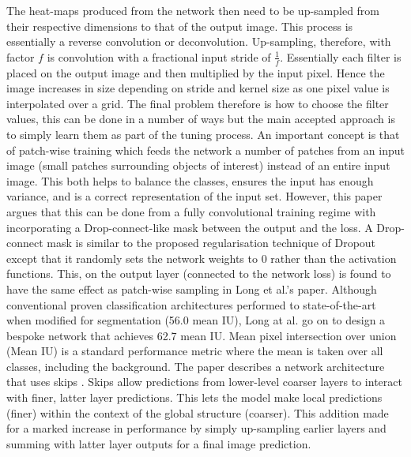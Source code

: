 \documentclass[11pt,twoside]{report}
\begin{document}
The heat-maps produced from the network then need to be up-sampled from their respective dimensions to that of the output image. This process is essentially a reverse convolution or deconvolution. Up-sampling, therefore, with factor $f$ is convolution with a fractional input stride of $\frac{1}{f}$. Essentially each filter is placed on the output image and then multiplied by the input pixel. Hence the image increases in size depending on stride and kernel size as one pixel value is interpolated over a grid. The final problem therefore is how to choose the filter values, this can be done in a number of ways but the main accepted approach is to simply learn them as part of the tuning process.
\newline \newline
An important concept is that of patch-wise training which feeds the network a number of patches from an input image (small patches surrounding objects of interest) instead of an entire input image. This both helps to balance the classes, ensures the input has enough variance, and is a correct representation of the input set. However, this paper argues that this can be done from a fully convolutional training regime with incorporating a Drop-connect-like mask \cite{Wan:2013:RNN:3042817.3043055} between the output and the loss. A Drop-connect mask is similar to the proposed regularisation technique of Dropout \cite{JMLR:v15:srivastava14a} except that it randomly sets the network weights to 0 rather than the activation functions. This, on the output layer (connected to the network loss) is found to have the same effect as patch-wise sampling in Long et al.'s paper.
\newline \newline
Although conventional proven classification architectures performed to state-of-the-art when modified for segmentation (56.0 mean IU), Long at al. \cite{DBLP:journals/corr/LongSD14} go on to design a bespoke network that achieves 62.7 mean IU. Mean pixel intersection over union (Mean IU) is a standard performance metric where the mean is taken over all classes, including the background. The paper describes a network architecture that uses skips \cite{Bishop:2006:PRM:1162264}. Skips allow predictions from lower-level coarser layers to interact with finer, latter layer predictions. This lets the model make local predictions (finer) within the context of the global structure (coarser). This addition made for a marked increase in performance by simply up-sampling earlier layers and summing with latter layer outputs for a final image prediction.
\end{document}
